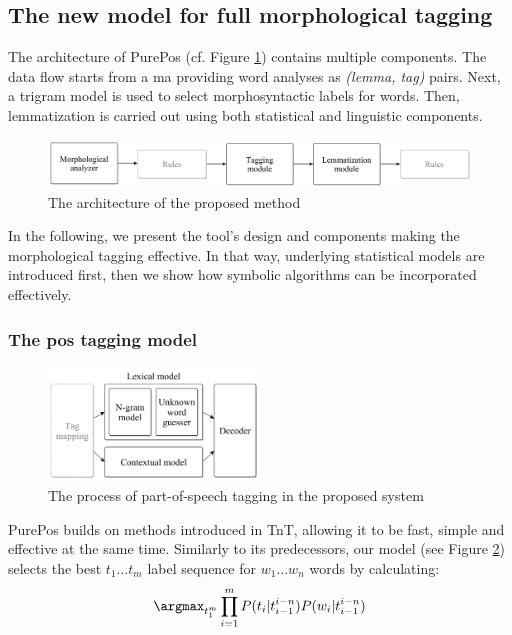 \subsection{The new model for full morphological tagging}
\label{sec:purepos}

The architecture of PurePos (cf. Figure \ref{fig:purepos-arch}) contains multiple components. 
The data flow starts from a \gls{ma} providing word analyses as \emph{(lemma, tag)} pairs. 
Next, a trigram model is used to select morphosyntactic labels for words. 
Then, lemmatization is carried out using both statistical and linguistic components. 

\begin{figure}[ht]
  \centering
  \includegraphics[width=1\textwidth]{MorphTagging/architecture.png} 
  \caption{The architecture of the proposed method}
  \label{fig:purepos-arch}
\end{figure}

In the following, we present the tool's design and components making the morphological tagging effective. 
In that way,  underlying statistical models are introduced first, then we show how symbolic algorithms can be incorporated effectively. 

\subsubsection{The \gls{pos} tagging model}

\begin{figure}[ht]
  \centering
  \includegraphics[width=0.5\textwidth]{MorphTagging/pos_arch.png} 
  \caption{The process of part-of-speech tagging in the proposed system}
  \label{fig:pos_arch}
\end{figure}

PurePos builds on methods introduced in TnT, allowing it to be fast, simple and effective at the same time. 
Similarly to its predecessors, our model (see Figure \ref{fig:pos_arch}) selects the best $t_1 \dots t_m$ label sequence for $w_1 \dots w_n$ words by calculating:
\begin{equation}
\argmax_{t_1^m} \prod_{i=1}^m P(t_i | t_{i-1}^{i-n}) P(w_i|t_{i-1}^{i-n})
\end{equation}

